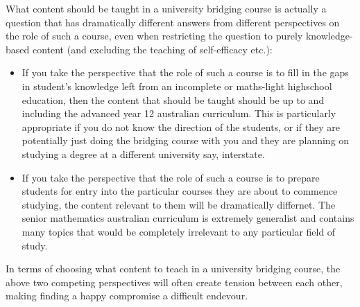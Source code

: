 \documentclass[twoside,12pt,a4paper]{report}
\begin{document}
What content should be taught in a university bridging course is actually a question that has dramatically different answers from different perspectives on the role of such a course, even when restricting the question to purely knowledge-based content (and excluding the teaching of self-efficacy etc.):
\begin{itemize}
	\item If you take the perspective that the role of such a course is to fill in the gaps in student's knowledge left from an incomplete or maths-light highschool education, then the content that should be taught should be up to and including the advanced year 12 australian curriculum. This is particularly appropriate if you do not know the direction of the students, or if they are potentially just doing the bridging course with you and they are planning on studying a degree at a different university say, interstate.
	\item If you take the perspective that the role of such a course is to prepare students for entry into the particular courses they are about to commence studying, the content relevant to them will be dramatically differnet. The senior mathematics australian curriculum is extremely generalist and contains many topics that would be completely irrelevant to any particular field of study. 
\end{itemize}
In terms of choosing what content to teach in a university bridging course, the above two competing perspectives will often create tension between each other, making finding a happy compromise a difficult endevour. 
\end{document}
